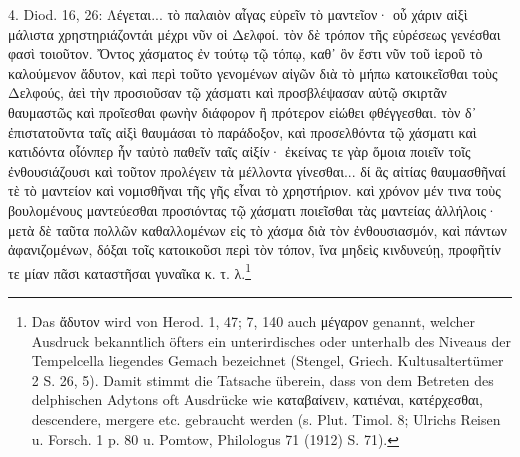 \documentclass[a4paper, 11pt, oneside]{article}
\begin{document}
4. Diod. 16, 26: Λέγεται... τὸ παλαιὸν αἶγας εὑρεῖν τὸ μαντεῖον· οὗ χάριν αἰξὶ μάλιστα χρηστηριάζοντάι μέχρι νῦν οἱ Δελφοί. τὸν δὲ τρόπον τῆς εὑρέσεως γενέσθαι φασὶ τοιοῦτον. Ὄντος χάσματος ἐν τούτῳ τῷ τόπῳ, καθ᾽ ὃν ἔστι νῦν τοῦ ἱεροῦ τὸ καλούμενον ἄδυτον, καὶ περὶ τοῦτο γενομένων αἰγῶν διὰ τὸ μήπω κατοικεῖσθαι τοὺς Δελφούς, ἀεὶ τὴν προσιοῦσαν τῷ χάσματι καὶ προσβλέψασαν αὐτῷ σκιρτᾶν θαυμαστῶς καὶ προῖεσθαι φωνὴν διάφορον ἢ πρότερον εἰώθει φθέγγεσθαι. τὸν δ᾽ ἐπιστατοῦντα ταῖς αἰξὶ θαυμάσαι τὸ παράδοξον, καὶ προσελθόντα τῷ χάσματι καὶ κατιδόντα οἷόνπερ ἦν ταὐτὸ παθεῖν ταῖς αἰξίν· ἐκείνας τε γὰρ ὅμοια ποιεῖν τοῖς ἐνθουσιάζουσι καὶ τοῦτον προλέγειν τὰ μέλλοντα γίνεσθαι... δί ἃς αἰτίας θαυμασθῆναί τὲ τὸ μαντείον καὶ νομισθῆναι τῆς γῆς εἶναι τὸ χρηστήριον. καὶ χρόνον μέν τινα τοὺς βουλομένους μαντεύεσθαι προσιόντας τῷ χάσματι ποιεῖσθαι τὰς μαντείας ἀλλήλοις· μετὰ δὲ ταῦτα πολλῶν καθαλλομένων εἰς τὸ χάσμα διὰ τὸν ἐνθουσιασμόν, καὶ πάντων ἀφανιζομένων, δόξαι τοῖς κατοικοῦσι περὶ τὸν τόπον, ἵνα μηδεὶς κινδυνεύῃ, προφῆτίν τε μίαν πᾶσι καταστῆσαι γυναῖκα κ. τ. λ.\footnote{Das ἄδυτον wird von Herod. 1, 47; 7, 140 auch μέγαρον genannt, welcher Ausdruck bekanntlich öfters ein unterirdisches oder unterhalb des Niveaus der Tempelcella liegendes Gemach bezeichnet (Stengel, Griech. Kultusaltertümer 2 S. 26, 5). Damit stimmt die Tatsache überein, dass von dem Betreten des delphischen Adytons oft Ausdrücke wie καταβαίνειν, κατιέναι, κατέρχεσθαι, descendere, mergere etc. gebraucht werden (s. Plut. Timol. 8; Ulrichs Reisen u. Forsch. 1 p. 80 u. Pomtow, Philologus 71 (1912) S. 71).}
\end{document}
